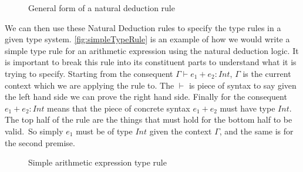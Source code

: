 \begin{figure}[htbp]
    \begin{prooftree}
    \end{prooftree}
    \caption{General form of a natural deduction rule}
    \label{fig:generalNatDectRule}
\end{figure}

We can then use these Natural Deduction rules to specify the type rules in a given type system\cite{ranta2012implementing,cardelli1996type,}.
\autoref{fig:simpleTypeRule} is an example of how we would write a simple type rule for an arithmetic expression using the natural deduction logic.
It is important to break this rule into its constituent parts to understand what it is trying to specify.
Starting from the consequent $\Gamma \vdash e_1 + e_2 : Int$, $\Gamma$ is the current context which we are applying the rule to.
The $\vdash$ is piece of syntax to say given the left hand side we can prove the right hand side.
Finally for the consequent $e_1 + e_2 : Int$ means that the piece of concrete syntax $e_1 + e_2$ must have type $Int$.
The top half of the rule are the things that must hold for the bottom half to be valid.\
So simply $e_1$ must be of type $Int$ given the context $\Gamma$, and the same is for the second premise\cite{cardelli1996type,ranta2012implementing}.

\begin{figure}[htbp]
    \begin{prooftree}
    \end{prooftree}
    \caption{Simple arithmetic expression type rule}
    \label{fig:simpleTypeRule}
\end{figure}